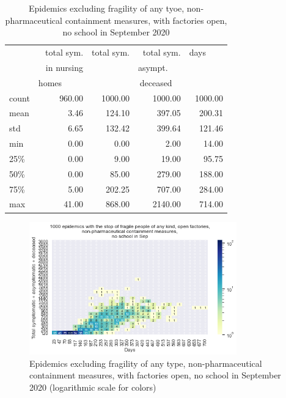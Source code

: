 \documentclass[11pt]{article}
\begin{document}
\begin{table}[H]
\center
\small
\begin{tabular}{lrrrr}
\toprule
{} & total sym.        &  total sym. & total sym.     & days~~~~ \\
{} & in nursing        &                  & asympt.~~~  & \\
{} & homes~~~~~  &                  & deceased~~ & \\
\midrule
count &     960.00 &             1000.00 &                 1000.00 & 1000.00 \\
mean  &       3.46 &              124.10 &                  397.05 &  200.31 \\
std   &       6.65 &              132.42 &                  399.64 &  121.46 \\
min   &       0.00 &                0.00 &                    2.00 &   14.00 \\
25\%   &       0.00 &                9.00 &                   19.00 &   95.75 \\
50\%   &       0.00 &               85.00 &                  279.00 &  188.00 \\
75\%   &       5.00 &              202.25 &                  707.00 &  284.00 \\
max   &      41.00 &              868.00 &                 2140.00 &  714.00 \\
\bottomrule
\end{tabular}

\label{EpidemicsNoAllFragileFacsOnT}
\caption{Epidemics excluding fragility of any tyoe, non-pharmaceutical containment measures, with factories open, no school in September 2020}
\end{table}


\begin{figure}[H]
\begin{center}
\includegraphics[width=0.8\textwidth]{HM30_readRunResults1k_with_NoAllFrag_openFacs_at20_plusHMlog.png}
\caption{Epidemics excluding fragility of any type, non-pharmaceutical containment measures, with factories open, no school in September 2020 (logarithmic scale for colors)}
\label{EpidemicsNoAllFragileFacsOnHM}
\end{center}
\end{figure}
\end{document}
